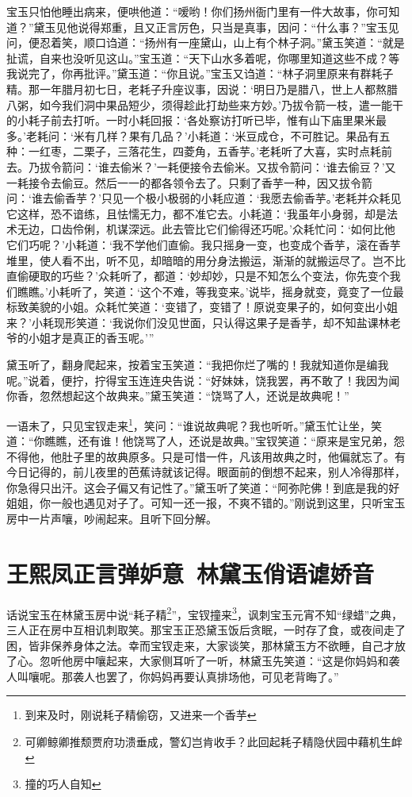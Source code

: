 \documentclass[12pt,oneside]{book}
\begin{document}
宝玉只怕他睡出病来，便哄他道：“嗳哟！你们扬州衙门里有一件大故事，你可知道？”黛玉见他说得郑重，且又正言厉色，只当是真事，因问：“什么事？”宝玉见问，便忍着笑，顺口诌道：“扬州有一座黛山，山上有个林子洞。”黛玉笑道：“就是扯谎，自来也没听见这山。”宝玉道：“天下山水多着呢，你哪里知道这些不成？等我说完了，你再批评。”黛玉道：“你且说。”宝玉又诌道：“林子洞里原来有群耗子精。那一年腊月初七日，老耗子升座议事，因说：‘明日乃是腊八，世上人都熬腊八粥，如今我们洞中果品短少，须得趁此打劫些来方妙。’乃拔令箭一枝，遣一能干的小耗子前去打听。一时小耗回报：‘各处察访打听已毕，惟有山下庙里果米最多。’老耗问：‘米有几样？果有几品？’小耗道：‘米豆成仓，不可胜记。果品有五种：一红枣，二栗子，三落花生，四菱角，五香芋。’老耗听了大喜，实时点耗前去。乃拔令箭问：‘谁去偷米？’一耗便接令去偷米。又拔令箭问：‘谁去偷豆？’又一耗接令去偷豆。然后一一的都各领令去了。只剩了香芋一种，因又拔令箭问：‘谁去偷香芋？’只见一个极小极弱的小耗应道：‘我愿去偷香芋。’老耗并众耗见它这样，恐不谙练，且怯懦无力，都不准它去。小耗道：‘我虽年小身弱，却是法术无边，口齿伶俐，机谋深远。此去管比它们偷得还巧呢。’众耗忙问：‘如何比他它们巧呢？’小耗道：‘我不学他们直偷。我只摇身一变，也变成个香芋，滚在香芋堆里，使人看不出，听不见，却暗暗的用分身法搬运，渐渐的就搬运尽了。岂不比直偷硬取的巧些？’众耗听了，都道：‘妙却妙，只是不知怎么个变法，你先变个我们瞧瞧。’小耗听了，笑道：‘这个不难，等我变来。’说毕，摇身就变，竟变了一位最标致美貌的小姐。众耗忙笑道：‘变错了，变错了！原说变果子的，如何变出小姐来？’小耗现形笑道：‘我说你们没见世面，只认得这果子是香芋，却不知盐课林老爷的小姐才是真正的香玉呢。’”

黛玉听了，翻身爬起来，按着宝玉笑道：“我把你烂了嘴的！我就知道你是编我呢。”说着，便拧，拧得宝玉连连央告说：“好妹妹，饶我罢，再不敢了！我因为闻你香，忽然想起这个故典来。”黛玉笑道：“饶骂了人，还说是故典呢！”

一语未了，只见宝钗走来\footnote{到来及时，刚说耗子精偷窃，又进来一个香芋}，笑问：“谁说故典呢？我也听听。”黛玉忙让坐，笑道：“你瞧瞧，还有谁！他饶骂了人，还说是故典。”宝钗笑道：“原来是宝兄弟，怨不得他，他肚子里的故典原多。只是可惜一件，凡该用故典之时，他偏就忘了。有今日记得的，前儿夜里的芭蕉诗就该记得。眼面前的倒想不起来，别人冷得那样，你急得只出汗。这会子偏又有记性了。”黛玉听了笑道：“阿弥陀佛！到底是我的好姐姐，你一般也遇见对子了。可知一还一报，不爽不错的。”刚说到这里，只听宝玉房中一片声嚷，吵闹起来。且听下回分解。



\chapter{王熙凤正言弹妒意~林黛玉俏语谑娇音}
话说宝玉在林黛玉房中说“耗子精\footnote{可卿鲸卿推颓贾府功溃垂成，警幻岂肯收手？此回起耗子精隐伏园中藉机生衅}”，宝钗撞来\footnote{撞的巧人自知}，讽刺宝玉元宵不知“绿蜡”之典，三人正在房中互相讥刺取笑。那宝玉正恐黛玉饭后贪眠，一时存了食，或夜间走了困，皆非保养身体之法。幸而宝钗走来，大家谈笑，那林黛玉方不欲睡，自己才放了心。忽听他房中嚷起来，大家侧耳听了一听，林黛玉先笑道：“这是你妈妈和袭人叫嚷呢。那袭人也罢了，你妈妈再要认真排场他，可见老背晦了。”
\end{document}
